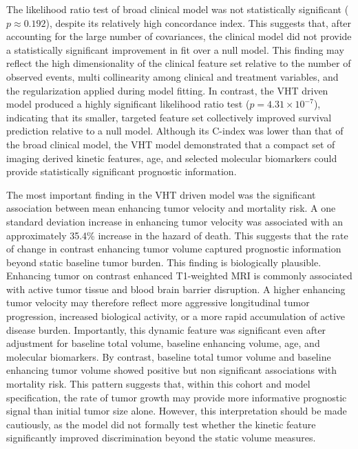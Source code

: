 The likelihood ratio test of broad clinical model was not statistically significant ($p \approx 0.192$), despite its relatively high concordance index. This suggests that, after accounting for the large number of covariances, the clinical model did not provide a statistically significant improvement in fit over a null model. This finding may reflect the high dimensionality of the clinical feature set relative to the number of observed events, multi collinearity among clinical and treatment variables, and the regularization applied during model fitting. In contrast, the VHT driven model produced a highly significant likelihood ratio test ($p = 4.31 \times 10^{-7}$), indicating that its smaller, targeted feature set collectively improved survival prediction relative to a null model. Although its C-index was lower than that of the broad clinical model, the VHT model demonstrated that a compact set of imaging derived kinetic features, age, and selected molecular biomarkers could provide statistically significant prognostic information.

The most important finding in the VHT driven model was the significant association between mean enhancing tumor velocity and mortality risk. A one standard deviation increase in enhancing tumor velocity was associated with an approximately 35.4\% increase in the hazard of death. This suggests that the rate of change in contrast enhancing tumor volume captured prognostic information beyond static baseline tumor burden. This finding is biologically plausible. Enhancing tumor on contrast enhanced T1-weighted MRI is commonly associated with active tumor tissue and blood brain barrier disruption. A higher enhancing tumor velocity may therefore reflect more aggressive longitudinal tumor progression, increased biological activity, or a more rapid accumulation of active disease burden. Importantly, this dynamic feature was significant even after adjustment for baseline total volume, baseline enhancing volume, age, and molecular biomarkers. By contrast, baseline total tumor volume and baseline enhancing tumor volume showed positive but non significant associations with mortality risk. This pattern suggests that, within this cohort and model specification, the rate of tumor growth may provide more informative prognostic signal than initial tumor size alone. However, this interpretation should be made cautiously, as the model did not formally test whether the kinetic feature significantly improved discrimination beyond the static volume measures.

